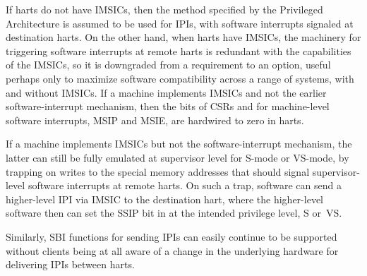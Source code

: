 If harts do not have IMSICs, then the method specified by the {\RISCV}
Privileged Architecture is assumed to be used for IPIs, with software
interrupts signaled at destination harts.
On the other hand, when harts have IMSICs, the machinery for triggering
software interrupts at remote harts is redundant with the capabilities
of the IMSICs, so it is downgraded from a requirement to an option,
useful perhaps only to maximize software compatibility across a range
of {\RISCV} systems, with and without IMSICs.
If a machine implements IMSICs and not the earlier software-interrupt
mechanism, then the bits of CSRs  and  for machine-level
software interrupts, MSIP and MSIE, are hardwired to zero in harts.

\begin{commentary}
If a machine implements IMSICs but not the software-interrupt
mechanism, the latter can still be fully emulated at supervisor level
for \mbox{S-mode} or \mbox{VS-mode}, by trapping on writes to the
special memory addresses that should signal supervisor-level software
interrupts at remote harts.
On such a trap, software can send a higher-level IPI via IMSIC to the
destination hart, where the higher-level software then can set the
SSIP bit in  at the intended privilege level, S or~VS.

Similarly, SBI functions for sending IPIs can easily continue to
be supported without clients being at all aware of a change in the
underlying hardware for delivering IPIs between harts.
\end{commentary}

